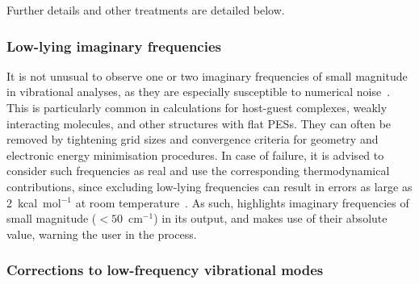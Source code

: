 Further details and other treatments are detailed below.

\subsubsection{Low-lying imaginary frequencies}

It is not unusual to observe one or two imaginary frequencies of small magnitude in vibrational analyses,
as they are especially susceptible to numerical noise~\cite{Jensen_2015}.
This is particularly common in calculations for host-guest complexes,
weakly interacting molecules,
and other structures with flat PESs.
They can often be removed by tightening grid sizes and convergence criteria for geometry and electronic energy minimisation procedures.
In case of failure,
it is advised to consider such frequencies as real and use the corresponding thermodynamical contributions,
since excluding low-lying frequencies can result in errors as large as 2~kcal~mol$^{-1}$ at room temperature~\cite{Jensen_2015}.
As such,
\overreact{} highlights imaginary frequencies of small magnitude ($< 50$~cm$^{-1}$) in its output,
and makes use of their absolute value,
warning the user in the process.

\subsubsection{Corrections to low-frequency vibrational modes}%
\label{sec:quasi-qrrho}

